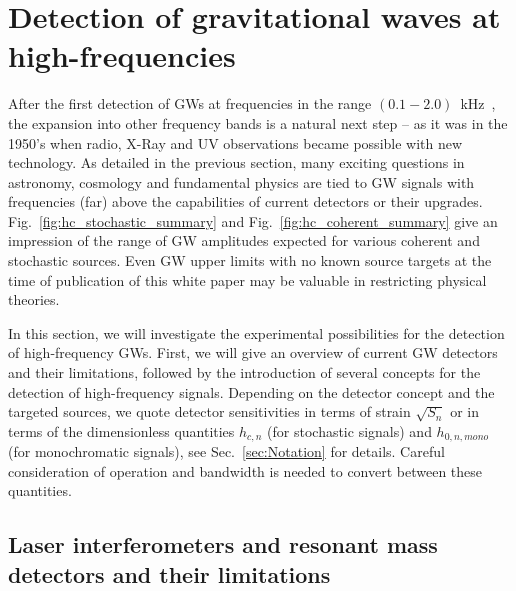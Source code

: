 \documentclass[11pt,a4paper]{article}
\begin{document}

\section{Detection of gravitational waves at high-frequencies}
\label{sec:exp}

After the first detection of GWs at frequencies in the range $(0.1 - 2.0)\,$ kHz~\cite{PhysRevX.9.031040}, the expansion into other frequency bands is a natural next step -- as it was in the 1950's when radio, X-Ray and UV observations became possible with new technology. As detailed in the previous section, many exciting questions in astronomy, cosmology and fundamental physics are tied to GW signals with frequencies (far) above the capabilities of current detectors or their upgrades. Fig.~\ref{fig:hc_stochastic_summary} and Fig.~\ref{fig:hc_coherent_summary} give an impression of the range of GW amplitudes expected for various coherent and stochastic sources.
%
Even GW upper limits with no known source targets at the time of publication {of this white paper} may be valuable in restricting physical theories.

In this section, we will investigate the experimental possibilities for the detection of high-frequency GWs. First, we will give an overview of current GW detectors and their limitations, followed by the introduction of several concepts for the detection of high-frequency signals.
%
{Depending on the detector concept and the targeted sources, we quote detector sensitivities in terms of strain $\sqrt{S_n}$ or in terms of the dimensionless quantities $h_{c,n}$ (for stochastic signals) and $h_{0,n,mono}$ (for monochromatic signals), see Sec.~\ref{sec:Notation} for details. Careful consideration of operation and bandwidth is needed to convert between these quantities. }

\subsection{Laser interferometers and resonant mass detectors and their limitations}
\label{sec:detectors}
\end{document}
